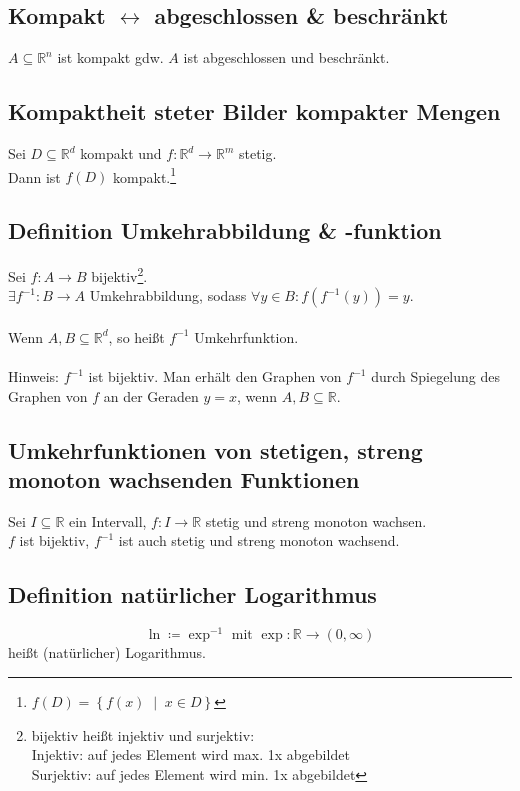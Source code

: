 \documentclass[halfparscip]{scrartcl}
\newcounter{subsection2}
\begin{document}
\subsection{Kompakt $\leftrightarrow$ abgeschlossen \& beschränkt}
$A \subseteq \mathbb{R}^n$ ist kompakt gdw. $A$ ist abgeschlossen und beschränkt.

\subsection{Kompaktheit steter Bilder kompakter Mengen}
Sei $D \subseteq \mathbb{R}^d$ kompakt und $f : \mathbb{R}^d \rightarrow \mathbb{R}^m$ stetig.\\
Dann ist $f(D)$ kompakt.\footnote{$f(D) = \left\{f(x) \;\middle|\; x \in D\right\}$}

\subsection{Definition Umkehrabbildung \& -funktion}
Sei $f: A \rightarrow B$ bijektiv\footnote{bijektiv heißt injektiv und surjektiv:\\Injektiv: auf jedes Element wird max. 1x abgebildet\\Surjektiv: auf jedes Element wird min. 1x abgebildet}.\\
$\exists f^{-1} : B \rightarrow A$ Umkehrabbildung, sodass $\forall y \in B: f(f^{-1}(y)) = y$.\\\\
Wenn $A, B \subseteq \mathbb{R}^d$, so heißt $f^{-1}$ Umkehrfunktion.\\\\
Hinweis: $f^{-1}$ ist bijektiv. Man erhält den Graphen von $f^{-1}$ durch Spiegelung des Graphen von $f$ an der Geraden $y=x$, wenn $A, B \subseteq \mathbb{R}$.

\subsection{Umkehrfunktionen von stetigen, streng monoton wachsenden Funktionen}
Sei $I \subseteq \mathbb{R}$ ein Intervall, $f : I \rightarrow \mathbb{R}$ stetig und streng monoton wachsen.\\
$f$ ist bijektiv, $f^{-1}$ ist auch stetig und streng monoton wachsend.

\subsection{Definition natürlicher Logarithmus}
\begin{equation*}
	\ln \coloneqq \exp^{-1} \text{ mit } \exp: \mathbb{R} \rightarrow (0, \infty)
\end{equation*}
heißt (natürlicher) Logarithmus.
\end{document}
